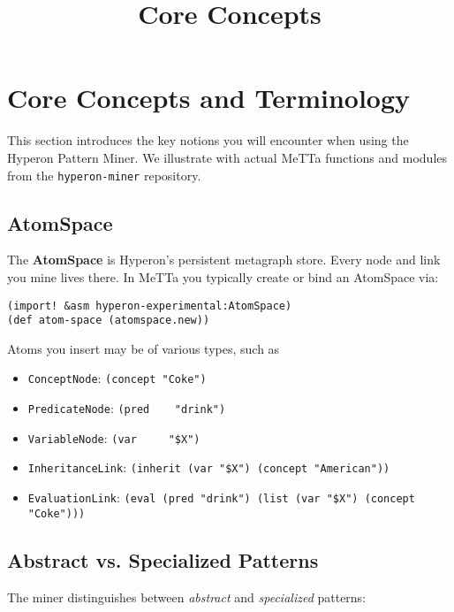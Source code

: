 \documentclass{article}
\title{Core Concepts}
\begin{document}
\section{Core Concepts and Terminology}

This section introduces the key notions you will encounter when using the Hyperon Pattern Miner.  We illustrate with actual MeTTa functions and modules from the \texttt{hyperon-miner} repository.

\subsection{AtomSpace}

The \textbf{AtomSpace} is Hyperon's persistent metagraph store.  Every node and link you mine lives there.  In MeTTa you typically create or bind an AtomSpace via:

\begin{verbatim}
(import! &asm hyperon-experimental:AtomSpace)
(def atom-space (atomspace.new))
\end{verbatim}

Atoms you insert may be of various types, such as

\begin{itemize}
  \item \texttt{ConceptNode}: \verb|(concept "Coke")|
  \item \texttt{PredicateNode}: \verb|(pred    "drink")|
  \item \texttt{VariableNode}:  \verb|(var     "$X")|
  \item \texttt{InheritanceLink}: 
    \verb|(inherit (var "$X") (concept "American"))|
  \item \texttt{EvaluationLink}:  
    \verb|(eval (pred "drink") (list (var "$X") (concept "Coke")))|
\end{itemize}

\subsection{Abstract vs. Specialized Patterns}

The miner distinguishes between \emph{abstract} and \emph{specialized} patterns:
\end{document}
